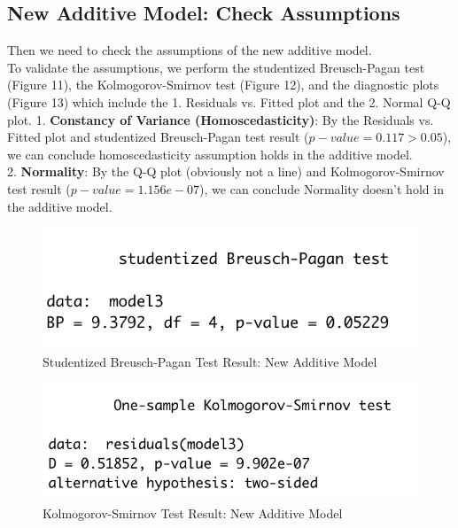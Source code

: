 \documentclass[11pt,a4paper]{article}
\begin{document}
\subsection{New Additive Model: Check Assumptions}
Then we need to check the assumptions of the new additive model.\\
To validate the assumptions, we perform the studentized Breusch-Pagan test (Figure 11), the Kolmogorov-Smirnov test (Figure 12), and the diagnostic plots (Figure 13) which include the 1. Residuals vs. Fitted plot and the 2. Normal Q-Q plot.
1. \textbf{Constancy of Variance (Homoscedasticity)}: By the Residuals vs. Fitted plot and studentized Breusch-Pagan test result ($p-value=0.117>0.05$), we can conclude homoscedasticity assumption holds in the additive model.\\
2. \textbf{Normality}: By the Q-Q plot (obviously not a line) and Kolmogorov-Smirnov test result ($p-value=1.156e-07$), we can conclude Normality doesn't hold in the additive model.
\begin{figure}[htb]
    \centering
    \includegraphics[scale=1]{BP2}
    \caption{Studentized Breusch-Pagan Test Result: New Additive Model}
    \label{}
\end{figure}
\begin{figure}[htb]
    \centering
    \includegraphics[scale=1]{KS2}
    \caption{Kolmogorov-Smirnov Test Result: New Additive Model}
    \label{}
\end{figure}
\end{document}
